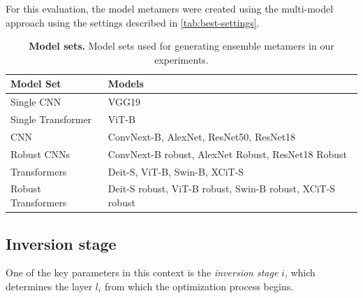 \documentclass[pdflatex,sn-mathphys-num]{sn-jnl}%
\theoremstyle{thmstyleone}%
\theoremstyle{thmstyletwo}%
\theoremstyle{thmstylethree}%
\begin{document}
For this evaluation, the model metamers were created using the multi-model approach using the settings described  in \cref{tab:best-settings}.



\begin{table}
    \centering
    \begin{tabular}{|l|l|}
        \hline
        \textbf{Model Set} & \textbf{Models} \\
        \hline
        Single CNN & VGG19 \\
        \hline
        Single Transformer & ViT-B \\
        \hline
        CNN & ConvNext-B, AlexNet, ResNet50, ResNet18 \\
        \hline
        Robust CNNs & ConvNext-B robust, AlexNet Robust, ResNet18 Robust \\
        \hline
        Transformers & Deit-S, ViT-B, Swin-B, XCiT-S \\
        \hline
        Robust Transformers & Deit-S robust, ViT-B robust, Swin-B robust, XCiT-S robust \\
        \hline
    \end{tabular}
    \caption{\textbf{Model sets.} Model sets used for generating ensemble metamers in our experiments.}
    \label{tab:model_sets}
\end{table}


\subsection{Inversion stage}


One of the key parameters in this context is the \emph{inversion stage} $i$, which determines the layer \( l_i \) from which the optimization process begins. %
\end{document}
